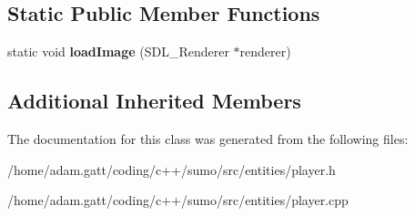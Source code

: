 \subsection*{Static Public Member Functions}
\begin{DoxyCompactItemize}
\item 
\mbox{\label{classPlayer_a80bf580631e2e2ce8e139d9ca12d0a6f}} 
static void {\bfseries load\+Image} (S\+D\+L\+\_\+\+Renderer $\ast$renderer)
\end{DoxyCompactItemize}
\subsection*{Additional Inherited Members}


The documentation for this class was generated from the following files\+:\begin{DoxyCompactItemize}
\item 
/home/adam.\+gatt/coding/c++/sumo/src/entities/player.\+h\item 
/home/adam.\+gatt/coding/c++/sumo/src/entities/player.\+cpp\end{DoxyCompactItemize}

